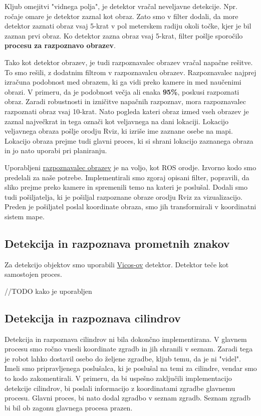 \documentclass[a4paper,11pt]{article}
\begin{document}
Kljub omejitvi "vidnega polja", je detektor vračal neveljavne detekcije. Npr. ročaje omare je detektor zaznal kot obraz. Zato smo v filter dodali, da more detektor zaznati obraz vsaj 5-krat v pol meterskem radiju okoli točke, kjer je bil zaznan prvi obraz. Ko detektor zazna obraz vsaj 5-krat, filter pošlje sporočilo \textbf{procesu za razpoznavo obrazev}. 

Tako kot detektor obrazev, je tudi razpoznavalec obrazev vračal napačne rešitve. To smo rešili, z dodatnim filtrom v razpoznavalcu obrazev. Razpoznavalec najprej izračuna podobnost med obrazem, ki ga vidi preko kamere in med naučenimi obrazi. V primeru, da je podobnost večja ali enaka \textbf{95\%}, poskusi razpoznati obraz. Zaradi robustnosti in izničitve napačnih razpoznav, mora razpoznavalec razpoznati obraz vsaj 10-krat. Nato pogleda kateri obraz izmed vseh obrazev je zaznal največkrat in tega označi kot veljavnega na dani lokaciji. Lokacijo veljavnega obraza pošlje orodju Rviz, ki izriše ime zaznane osebe na mapi. Lokacijo obraza prejme tudi glavni proces, ki si shrani lokacijo zaznanega obraza in jo nato uporabi pri planiranju.
 
Uporabljeni \href{http://wiki.ros.org/face_recognition}{razpoznavalec obrazev} je na voljo, kot ROS orodje. Izvorno kodo smo predelali za naše potrebe. Implementirali smo zgoraj opisani filter, popravili, da sliko prejme preko kamere in spremenili temo na kateri je poslušal. Dodali smo tudi pošiljatelja, ki je pošiljal razpoznane obraze orodju Rviz za vizualizacijo. Preden je pošiljatel poslal koordinate obraza, smo jih transformirali v koordinatni sistem mape.

\subsection{Detekcija in razpoznava prometnih znakov}

Za detekcijo objektov smo uporabili \href{https://github.com/vicoslab/vicos_ros/tree/master/detection/dlib_detector/src}{Vicos-ov} detektor. Detektor teče kot samostojen proces.

//TODO kako je uporabljen

\subsection{Detekcija in razpoznava cilindrov}

Detekcija in razpoznava cilindrov ni bila dokončno implementirana. V glavnem procesu smo ročno vnesli koordinate zgradb in jih shranili v seznam. Zaradi tega je robot lahko dostavil osebo do željene zgradbe, kljub temu, da je ni "videl". Imeli smo pripravljenega poslušalca, ki je poslušal na temi za cilindre, vendar smo to kodo zakomentirali. V primeru, da bi uspešno zaključili implementacijo detekcije cilindrov, bi poslali informacijo z koordinatami zgradbe glavnemu procesu. Glavni proces, bi nato dodal zgradbo v seznam zgradb. Seznam zgradb bi bil ob zagonu glavnega procesa prazen.
\end{document}
